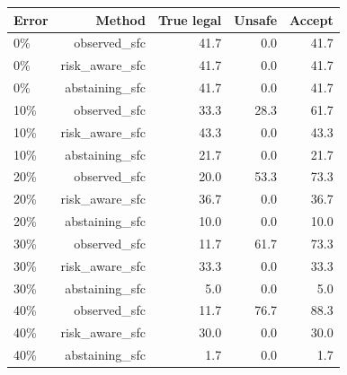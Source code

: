 \begin{tabular}{lrrrr}
\toprule
Error & Method & True legal & Unsafe & Accept \\
\midrule
0\% & observed\_sfc & 41.7 & 0.0 & 41.7 \\
0\% & risk\_aware\_sfc & 41.7 & 0.0 & 41.7 \\
0\% & abstaining\_sfc & 41.7 & 0.0 & 41.7 \\
10\% & observed\_sfc & 33.3 & 28.3 & 61.7 \\
10\% & risk\_aware\_sfc & 43.3 & 0.0 & 43.3 \\
10\% & abstaining\_sfc & 21.7 & 0.0 & 21.7 \\
20\% & observed\_sfc & 20.0 & 53.3 & 73.3 \\
20\% & risk\_aware\_sfc & 36.7 & 0.0 & 36.7 \\
20\% & abstaining\_sfc & 10.0 & 0.0 & 10.0 \\
30\% & observed\_sfc & 11.7 & 61.7 & 73.3 \\
30\% & risk\_aware\_sfc & 33.3 & 0.0 & 33.3 \\
30\% & abstaining\_sfc & 5.0 & 0.0 & 5.0 \\
40\% & observed\_sfc & 11.7 & 76.7 & 88.3 \\
40\% & risk\_aware\_sfc & 30.0 & 0.0 & 30.0 \\
40\% & abstaining\_sfc & 1.7 & 0.0 & 1.7 \\
\bottomrule
\end{tabular}
